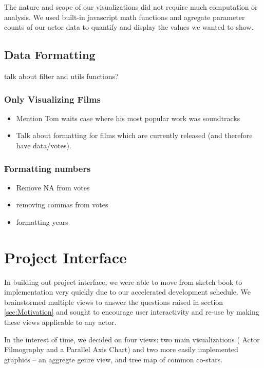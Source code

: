 \documentclass[12pt]{article}
\begin{document}
	The nature and scope of our visualizations did not require much computation or analysis.  We used built-in javascript math functions and agregate parameter counts of our actor data to quantify and display the values we wanted to show.

\subsection{Data Formatting}

talk about filter and utils functions?
\subsubsection{Only Visualizing Films}
	
	\begin{itemize}
			\item Mention Tom waits case where his most popular work was soundtracks
			\item Talk about formatting for films which are currently released (and therefore have data/votes).
	\end{itemize}
	
\subsubsection{Formatting numbers}
	
	\begin{itemize}
		\item Remove NA from votes
		\item removing commas from votes
		\item formatting years
	\end{itemize}


\newpage 

\section{Project Interface}
In building out project interface, we were able to move from sketch book to implementation very quickly due to our accelerated development schedule. We brainstormed multiple views to answer the questions raised in section \ref{sec:Motivation} and sought to encourage user interactivity and re-use by making these views applicable to any actor.  

In the interest of time, we  decided on four views:  two main visualizations ( Actor Filmography and a Parallel Axis Chart) and two more easily implemented graphics -- an aggregte genre view, and tree map of common co-stars.
\end{document}
